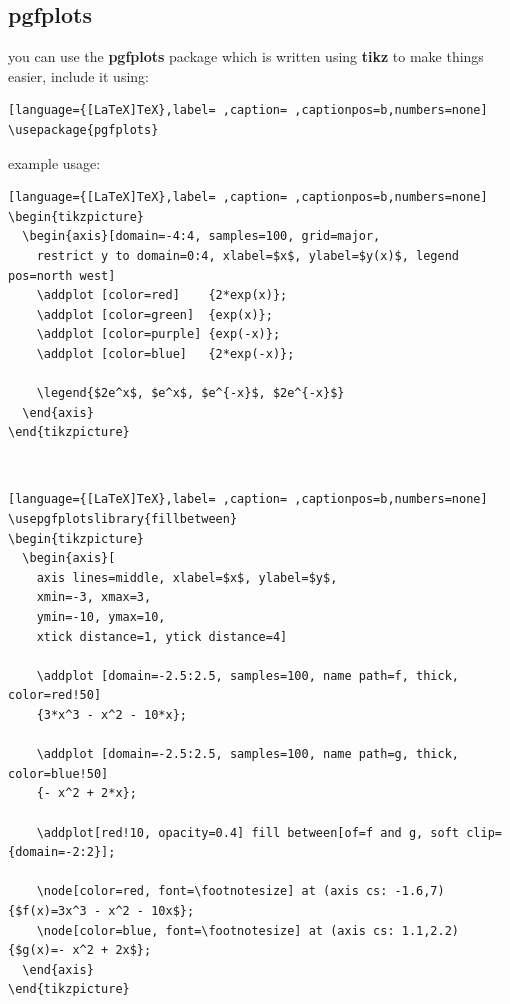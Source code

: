 \documentclass[a4paper,12pt]{article}
\begin{document}
\subsection{pgfplots}
\label{sec:org2f18aee}
you can use the \textbf{pgfplots} package which is written using \textbf{tikz} to make things easier, include it using:\\[0pt]
\begin{lstlisting}[language={[LaTeX]TeX},label= ,caption= ,captionpos=b,numbers=none]
\usepackage{pgfplots}
\end{lstlisting}
example usage:\\[0pt]
\begin{lstlisting}[language={[LaTeX]TeX},label= ,caption= ,captionpos=b,numbers=none]
\begin{tikzpicture}
  \begin{axis}[domain=-4:4, samples=100, grid=major,
    restrict y to domain=0:4, xlabel=$x$, ylabel=$y(x)$, legend pos=north west]
    \addplot [color=red]    {2*exp(x)};
    \addplot [color=green]  {exp(x)};
    \addplot [color=purple] {exp(-x)};
    \addplot [color=blue]   {2*exp(-x)};

    \legend{$2e^x$, $e^x$, $e^{-x}$, $2e^{-x}$}
  \end{axis}
\end{tikzpicture}
\end{lstlisting}

\\[0pt]

\begin{lstlisting}[language={[LaTeX]TeX},label= ,caption= ,captionpos=b,numbers=none]
\usepgfplotslibrary{fillbetween}
\begin{tikzpicture}
  \begin{axis}[
    axis lines=middle, xlabel=$x$, ylabel=$y$,
    xmin=-3, xmax=3,
    ymin=-10, ymax=10,
    xtick distance=1, ytick distance=4]

    \addplot [domain=-2.5:2.5, samples=100, name path=f, thick, color=red!50]
    {3*x^3 - x^2 - 10*x};

    \addplot [domain=-2.5:2.5, samples=100, name path=g, thick, color=blue!50]
    {- x^2 + 2*x};

    \addplot[red!10, opacity=0.4] fill between[of=f and g, soft clip={domain=-2:2}];

    \node[color=red, font=\footnotesize] at (axis cs: -1.6,7) {$f(x)=3x^3 - x^2 - 10x$};
    \node[color=blue, font=\footnotesize] at (axis cs: 1.1,2.2) {$g(x)=- x^2 + 2x$};
  \end{axis}
\end{tikzpicture}
\end{lstlisting}
\end{document}
